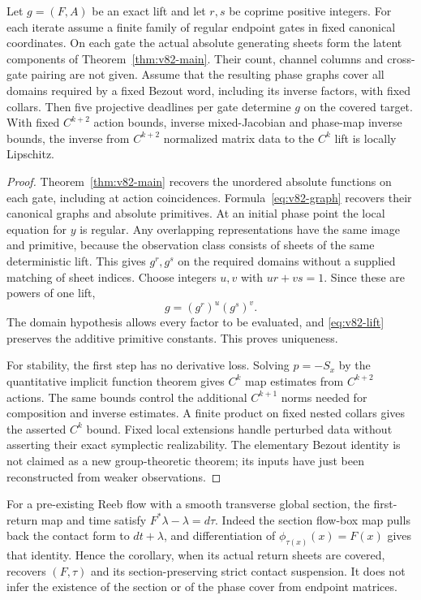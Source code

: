 \begin{corollary}
\label{cor:v82-return}
Let $g=(F,A)$ be an exact lift and let $r,s$ be coprime positive integers.
For each iterate assume a finite family of regular endpoint gates in
fixed canonical coordinates. On each gate the actual absolute generating
sheets form the latent components of Theorem~\ref{thm:v82-main}.
Their count, channel columns and cross-gate pairing are not given.
Assume that the resulting phase graphs cover all domains required by
a fixed Bezout word, including its inverse factors, with fixed collars.
Then five projective deadlines per gate determine $g$ on the covered
target. With fixed $C^{k+2}$ action bounds, inverse mixed-Jacobian and
phase-map inverse bounds, the inverse from $C^{k+2}$ normalized matrix
data to the $C^k$ lift is locally Lipschitz.
\end{corollary}
\begin{proof}
Theorem~\ref{thm:v82-main} recovers the unordered absolute functions on
each gate, including at action coincidences. Formula~\eqref{eq:v82-graph}
recovers their canonical graphs and absolute primitives. At an initial
phase point the local equation for $y$ is regular. Any overlapping
representations have the same image and primitive, because the
observation class consists of sheets of the same deterministic lift.
This gives $g^r,g^s$ on the required domains without a supplied matching
of sheet indices. Choose integers $u,v$ with $ur+vs=1$. Since these are
powers of one lift,
\[
                           g=(g^r)^u(g^s)^v.
\]
The domain hypothesis allows every factor to be evaluated, and
\eqref{eq:v82-lift} preserves the additive primitive constants.
This proves uniqueness.

For stability, the first step has no derivative loss. Solving
$p=-S_x$ by the quantitative implicit function theorem gives $C^k$
map estimates from $C^{k+2}$ actions. The same bounds control the
additional $C^{k+1}$ norms needed for composition and inverse estimates.
A finite product on fixed nested collars gives the asserted $C^k$ bound.
Fixed local extensions handle perturbed data without asserting their
exact symplectic realizability. The elementary Bezout identity is not
claimed as a new group-theoretic theorem; its inputs have just been
reconstructed from weaker observations.
\end{proof}

For a pre-existing Reeb flow with a smooth transverse global section,
the first-return map and time satisfy
$F^*\lambda-\lambda=d\tau$. Indeed the section flow-box map pulls
back the contact form to $dt+\lambda$, and differentiation of
$\phi_{\tau(x)}(x)=F(x)$ gives that identity. Hence the corollary,
when its actual return sheets are covered, recovers $(F,\tau)$ and its
section-preserving strict contact suspension. It does not infer the
existence of the section or of the phase cover from endpoint matrices.


